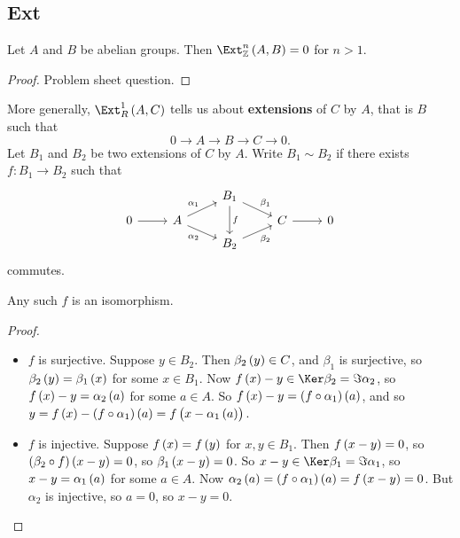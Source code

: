 \subsection{Ext}

\begin{proposition}
Let $ A $ and $ B $ be abelian groups. Then $ \Ext_\ZZ^n\br{A, B} = 0 $ for $ n > 1 $.
\end{proposition}

\begin{proof}
Problem sheet question.
\end{proof}

More generally, $ \Ext_R^1\br{A, C} $ tells us about \textbf{extensions} of $ C $ by $ A $, that is $ B $ such that
$$ 0 \to A \to B \to C \to 0. $$
Let $ B_1 $ and $ B_2 $ be two extensions of $ C $ by $ A $. Write $ B_1 \sim B_2 $ if there exists $ f : B_1 \to B_2 $ such that
$$
\begin{tikzcd}[row sep=tiny]
& & B_1 \arrow{dr}{\beta_1} \arrow{dd}{f} & & \\
0 \arrow{r} & A \arrow{ur}{\alpha_1} \arrow[swap]{dr}{\alpha_2} & & C \arrow{r} & 0 \\
& & B_2 \arrow[swap]{ur}{\beta_2} & &
\end{tikzcd}
$$
commutes.

\begin{proposition}
Any such $ f $ is an isomorphism.
\end{proposition}

\begin{proof}
\hfill
\begin{itemize}
\item $ f $ is surjective. Suppose $ y \in B_2 $. Then $ \beta_2\br{y} \in C $, and $ \beta_1 $ is surjective, so $ \beta_2\br{y} = \beta_1\br{x} $ for some $ x \in B_1 $. Now $ f\br{x} - y \in \Ker \beta_2 = \Im \alpha_2 $, so $ f\br{x} - y = \alpha_2\br{a} $ for some $ a \in A $. So $ f\br{x} - y = \br{f \circ \alpha_1}\br{a} $, and so $ y = f\br{x} - \br{f \circ \alpha_1}\br{a} = f\br{x - \alpha_1\br{a}} $.
\item $ f $ is injective. Suppose $ f\br{x} = f\br{y} $ for $ x, y \in B_1 $. Then $ f\br{x - y} = 0 $, so $ \br{\beta_2 \circ f}\br{x - y} = 0 $, so $ \beta_1\br{x - y} = 0 $. So $ x - y \in \Ker \beta_1 = \Im \alpha_1 $, so $ x - y = \alpha_1\br{a} $ for some $ a \in A $. Now $ \alpha_2\br{a} = \br{f \circ \alpha_1}\br{a} = f\br{x - y} = 0 $. But $ \alpha_2 $ is injective, so $ a = 0 $, so $ x - y = 0 $.
\end{itemize}
\end{proof}

